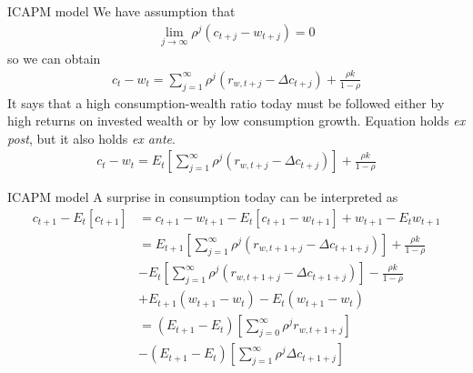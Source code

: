 \documentclass{beamer}
\begin{document}
\begin{frame}{ICAPM model}
	We have assumption that
	\begin{align*}
		\lim _{j \rightarrow \infty} \rho^{j}\left(c_{t+j}-w_{t+j}\right)=0
	\end{align*}
	so we can obtain
	\begin{align}
		c_t - w_t = \sum_{j=1}^{\infty} \rho^{j}\left(r_{w, t+j}-\Delta c_{t+j}\right)+\frac{\rho k}{1-\rho}
	\end{align}
	It says that a high consumption-wealth ratio today must be followed either by high returns on invested wealth or by low consumption growth. Equation holds \textit{ex post}, but it also
	holds \textit{ex ante}.
	\begin{align}
		c_t - w_t = E_t \left[\sum_{j=1}^{\infty} \rho^{j}\left(r_{w, t+j}-\Delta c_{t+j}\right)\right] +\frac{\rho k}{1-\rho}\label{consumptionwealthratio}
	\end{align}

\end{frame}

\begin{frame}{ICAPM model}
	A surprise in consumption today can be interpreted as
	\begin{align}
		c_{t+1}-E_{t}\left[c_{t+1}\right] &=c_{t+1}-w_{t+1}-E_{t}\left[c_{t+1}-w_{t+1}\right]+w_{t+1} - E_{t} w_{t+1}\\
		&= E_{t+1} \left[\sum_{j=1}^{\infty} \rho^{j}\left(r_{w, t+1+j}-\Delta c_{t+1+j}\right)\right] +\frac{\rho k}{1-\rho}\\
		& - E_{t} \left[\sum_{j=1}^{\infty} \rho^{j}\left(r_{w, t+1+j}-\Delta c_{t+1+j}\right)\right] -\frac{\rho k}{1-\rho}\\
		&+E_{t+1}(w_{t+1} -w_t) - E_t \left( w_{t+1} -w_t \right) \\
		& = \left(E_{t+1} - E_t \right) \left[\sum_{j=0}^{\infty} \rho^{j} r_{w, t+1+j} \right]\\
		&-\left(E_{t+1} - E_t \right) \left[\sum_{j=1}^{\infty} \rho^{j} \Delta c_{t+1+j} \right]\label{consumption shock}
	\end{align}
\end{frame}
\end{document}

